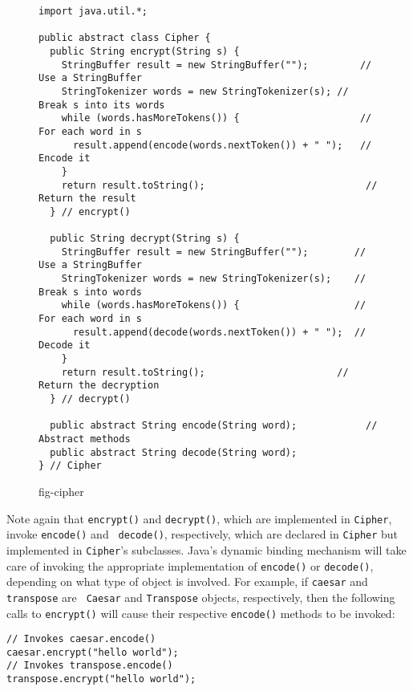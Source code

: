 \begin{figure}[h!]
\jjjprogstart
\begin{jjjlisting}[35pc]
\begin{lstlisting}
import java.util.*;

public abstract class Cipher {
  public String encrypt(String s) {
    StringBuffer result = new StringBuffer("");         // Use a StringBuffer
    StringTokenizer words = new StringTokenizer(s); // Break s into its words
    while (words.hasMoreTokens()) {                     // For each word in s
      result.append(encode(words.nextToken()) + " ");   //  Encode it
    }
    return result.toString();                            // Return the result
  } // encrypt()

  public String decrypt(String s) {
    StringBuffer result = new StringBuffer("");        // Use a StringBuffer
    StringTokenizer words = new StringTokenizer(s);    // Break s into words
    while (words.hasMoreTokens()) {                    // For each word in s
      result.append(decode(words.nextToken()) + " ");  //  Decode it
    }
    return result.toString();                       // Return the decryption
  } // decrypt()

  public abstract String encode(String word);            // Abstract methods
  public abstract String decode(String word);
} // Cipher
\end{lstlisting}
\end{jjjlisting}
{fig-cipher}
\end{figure}


Note again that {\tt encrypt()} and {\tt decrypt()}, which are
implemented in \mbox{\tt Cipher}, invoke {\tt encode()} and {\tt
decode()},  respectively, which are declared in {\tt Cipher} but
implemented in {\tt Cipher}'s subclasses.  Java's dynamic binding
mechanism will take care of invoking the appropriate implementation of
{\tt encode()} or {\tt decode()}, depending on what type of object is
involved.  For example, if {\tt caesar} and {\tt transpose} are {\tt
Caesar} and {\tt Transpose} objects, respectively, then the following
calls to {\tt encrypt()} will cause their respective {\tt encode()}
methods to be invoked:

\begin{jjjlisting}
\begin{lstlisting}
// Invokes caesar.encode()
caesar.encrypt("hello world");     
// Invokes transpose.encode()
transpose.encrypt("hello world");  
\end{lstlisting}
\end{jjjlisting}

